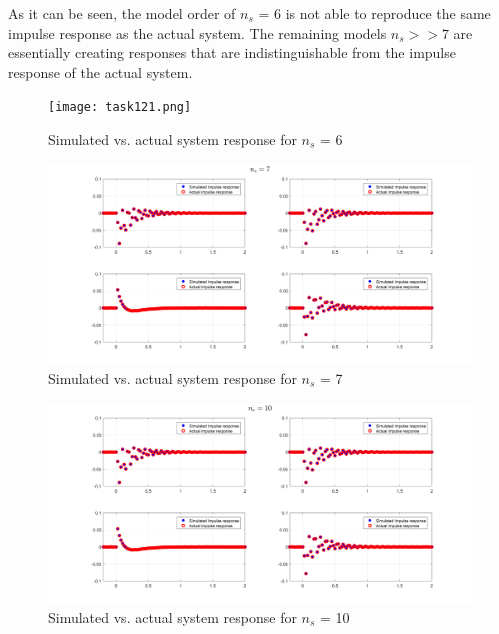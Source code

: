 \documentclass[paper=US leter, fontsize=11pt]{scrartcl}
\begin{document}
As it can be seen, the model order of $n_{s}$ = 6 is not able to reproduce the same impulse response as the actual system. The remaining models $n_{s}>>7$ are essentially creating responses that are indistinguishable from the impulse response of the actual system.
\newpage

\begin{figure}[ht!]  
	\centering    
		\centering  
		\texttt{[image: task121.png]}  
\caption{Simulated vs. actual system response for $n_{s}$ = 6}
	\label{task121} 
\end{figure} 

\begin{figure}[ht!]  
	\centering    
	\includegraphics[scale=0.4,trim={5cm 0 0 0},clip]{task122.png}  
\caption{Simulated vs. actual system response for $n_{s}$ = 7}
	\label{task122} 
\end{figure} 


\begin{figure}[ht!]  
	\centering    
	\includegraphics[scale=0.4,trim={5cm 0 0 0},clip]{task123.png}  
\caption{Simulated vs. actual system response for $n_{s}$ = 10}
	\label{task123} 
\end{figure} 
\end{document}
